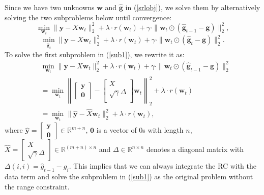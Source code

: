 \documentclass[journal]{IEEEtran}
\begin{document}
   Since we have two unknowns $\textbf{w}$ and $\hat{\textbf{g}}$ in (\ref{srlobj}), we solve them by alternatively solving the two subproblems below until convergence:
   \begin{equation}
     \min_{\textbf{w}_t} \|\textbf{y}-X\textbf{w}_t\|^2_2+  \lambda\cdot r(\textbf{w}_t) +\gamma  \cdot  \|\textbf{w}_t\odot (\hat{\textbf{g}}_{t-1} -\textbf{g})  \|_2^2,  \label{sub1}
   \end{equation}
     \begin{equation}
       \min_{\hat{\textbf{g}}_t} \|\textbf{y}-X\textbf{w}_t\|^2_2+  \lambda \cdot r(\textbf{w}_t) +\gamma\cdot  \|\textbf{w}_t\odot (\hat{\textbf{g}}_t -\textbf{g})  \|_2^2.\label{sub2}
 \end{equation}
   To solve the first subproblem in (\ref{sub1}),  we rewrite  it as:
   \begin{align} &\min_{\textbf{w}_t} \|\textbf{y}-X\textbf{w}_t\|^2_2+  \lambda \cdot r(\textbf{w}_t) +\gamma  \cdot  \|\textbf{w}_t\odot (\hat{\textbf{g}}_{t-1} -\textbf{g})  \|_2^2\nonumber \\
   & = \min_{\textbf{w}_t} \left\|\left[\begin{array}{c}\textbf{y}  \nonumber \\ \textbf{0}
   \end{array}\right]-
   \left[\begin{array}{c}X  \nonumber \\
   \sqrt{\gamma}\Delta   \\
   \end{array}\right]\textbf{w}_t \right\|^2_2 + \lambda\cdot r(\textbf{w}_t)\nonumber \\
   &  =  \min_{\textbf{w}_t}   \|\hat{\textbf{y}}-\hat{X}\textbf{w}_t\|^2_2+\lambda\cdot r(\textbf{w}_t),        \label{eq09}
   \end{align}
   where  $\hat{\textbf{y}}=\left[\begin{array}{c}\textbf{y} \\
   \textbf{0}
   \end{array}\right] \in \mathbb{R}^{m+n}$, $\textbf{0}$ is a vector of 0s with length $n$,  $\hat{X}=\left[\begin{array}{c}X \\
   \sqrt{\gamma}\Delta   \end{array}\right]  \in \mathbb{R}^{(m+n)\times n}$ and  $\Delta \in \mathbb{R}^{n\times n}$ denotes a diagonal matrix with $\Delta(i,i)=\hat{g}_{t-1}-g_i$.
   This implies that we can always integrate the RC with the data term and  solve the subproblem in (\ref{sub1}) as the original problem without the range constraint.
\end{document}
